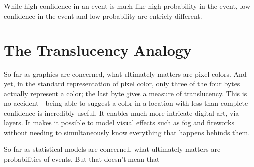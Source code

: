 \documentclass{article}
\begin{document}
While high confidence in an event is much like high probability in the event, low confidence in the event and low probability are entriely different. 


\section{The Translucency Analogy}


    So far as graphics are concerned, what ultimately matters are pixel colors. 
    And yet, in the standard representation of pixel color, only three of the four bytes actually represent a color; the last byte gives a measure of translucency.
    This is no accident---being able to suggest a color in a location with less than complete confidence is incredibly useful. 
    It enables much more intricate digital art, via layers. 
    It makes it possible to model visual effects such as fog and fireworks without needing to simultaneously know everything that happens behinds them.

    
    So far as statistical models are concerned, what ultimately matters are probabilities of events. 
    But that doesn't mean that 
    
    









\end{document}
